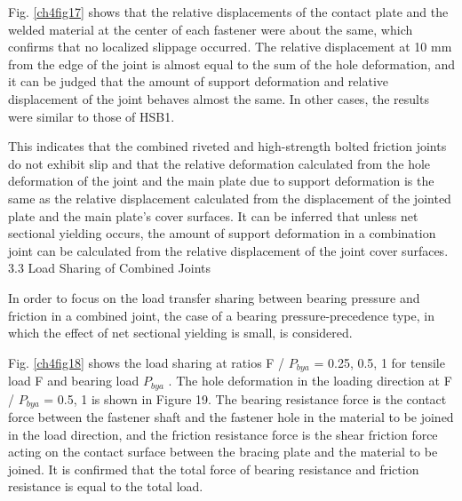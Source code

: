 Fig. \ref{ch4fig17} shows that the relative displacements of the contact plate and the welded material at the center of each fastener were about the same, which confirms that no localized slippage occurred. The relative displacement at 10 mm from the edge of the joint is almost equal to the sum of the hole deformation, and it can be judged that the amount of support deformation and relative displacement of the joint behaves almost the same. In other cases, the results were similar to those of HSB1.

This indicates that the combined riveted and high-strength bolted friction joints do not exhibit slip and that the relative deformation calculated from the hole deformation of the joint and the main plate due to support deformation is the same as the relative displacement calculated from the displacement of the jointed plate and the main plate's cover surfaces. It can be inferred that unless net sectional yielding occurs, the amount of support deformation in a combination joint can be calculated from the relative displacement of the joint cover surfaces.
3.3 Load Sharing of Combined Joints

In order to focus on the load transfer sharing between bearing pressure and friction in a combined joint, the case of a bearing pressure-precedence type, in which the effect of net sectional yielding is small, is considered.

Fig. \ref{ch4fig18} shows the load sharing at ratios F / $P_{bya}$ = 0.25, 0.5, 1 for tensile load F and bearing load $P_{bya}$ . The hole deformation in the loading direction at F / $P_{bya}$ = 0.5, 1 is shown in Figure 19. The bearing resistance force is the contact force between the fastener shaft and the fastener hole in the material to be joined in the load direction, and the friction resistance force is the shear friction force acting on the contact surface between the bracing plate and the material to be joined. It is confirmed that the total force of bearing resistance and friction resistance is equal to the total load.


